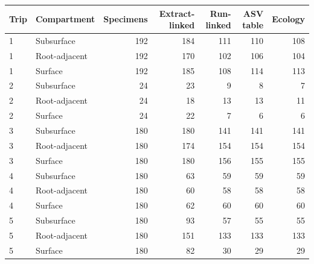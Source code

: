 \begin{tabular}{llrrrrr}
\toprule
Trip & Compartment & Specimens & Extract-linked & Run-linked & ASV table & Ecology \\
\midrule
1 & Subsurface & 192 & 184 & 111 & 110 & 108 \\
1 & Root-adjacent & 192 & 170 & 102 & 106 & 104 \\
1 & Surface & 192 & 185 & 108 & 114 & 113 \\
2 & Subsurface & 24 & 23 & 9 & 8 & 7 \\
2 & Root-adjacent & 24 & 18 & 13 & 13 & 11 \\
2 & Surface & 24 & 22 & 7 & 6 & 6 \\
3 & Subsurface & 180 & 180 & 141 & 141 & 141 \\
3 & Root-adjacent & 180 & 174 & 154 & 154 & 154 \\
3 & Surface & 180 & 180 & 156 & 155 & 155 \\
4 & Subsurface & 180 & 63 & 59 & 59 & 59 \\
4 & Root-adjacent & 180 & 60 & 58 & 58 & 58 \\
4 & Surface & 180 & 62 & 60 & 60 & 60 \\
5 & Subsurface & 180 & 93 & 57 & 55 & 55 \\
5 & Root-adjacent & 180 & 151 & 133 & 133 & 133 \\
5 & Surface & 180 & 82 & 30 & 29 & 29 \\
\bottomrule
\end{tabular}
